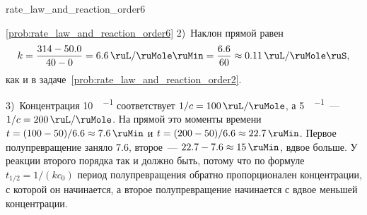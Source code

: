 \begin{problem}{}{rate_law_and_reaction_order6}
\begin{sol}{\ref{prob:rate_law_and_reaction_order6}}
        2)~Наклон прямой равен
        \begin{equation*}
            k = \frac{314 - \num{50,0}}{40 - 0} = \qty{6,6}{\ruL\per\ruMole\ruMin} = \frac{\num{6,6}}{60} \approx \qty{0,11}{\ruL\per\ruMole\ruS},
        \end{equation*}
        как и в задаче~\ref{prob:rate_law_and_reaction_order2}.

        3)~Концентрация \qty{10}{\ruMmole\per\ruL} соответствует $1/c = \qty{100}{\ruL\per\ruMole}$, а \qty{5}{\ruMmole\per\ruL}~--- $1/c = \qty{200}{\ruL\per\ruMole}$. На прямой это моменты времени $t = (100 - 50)/\num{6,6} \approx \qty{7,6}{\ruMin}$ и $t = (200 - 50)/\num{6,6} \approx \qty{22,7}{\ruMin}$. Первое полупревращение заняло \qty{7,6}{\ruMin}, второе~--- $\num{22,7} - \num{7,6} \approx \qty{15}{\ruMin}$, вдвое больше. У реакции второго порядка так и должно быть, потому что по формуле $t_{1/2} = 1/(kc_0)$ период полупревращения обратно пропорционален концентрации, с которой он начинается, а второе полупревращение начинается с вдвое меньшей концентрации.
    \end{sol}
\end{problem}

